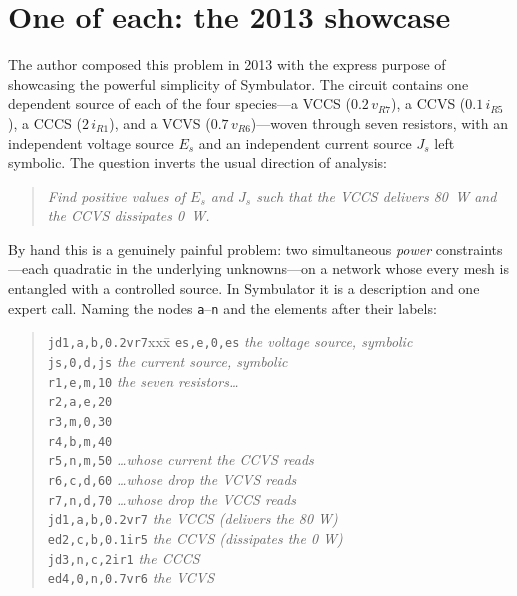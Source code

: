 \documentclass[11pt,oneside]{report}
\newcommand{\code}[1]{\texttt{#1}}
\begin{document}
\section{One of each: the 2013 showcase}
\label{sec:showcase2013}

The author composed this problem in 2013 with the express purpose of
showcasing the powerful simplicity of Symbulator. The circuit
contains one dependent source of each of the four species---a VCCS
($0.2\,v_{R7}$), a CCVS ($0.1\,i_{R5}$), a CCCS ($2\,i_{R1}$), and a
VCVS ($0.7\,v_{R6}$)---woven through seven resistors, with an
independent voltage source $E_s$ and an independent current source
$J_s$ left symbolic. The question inverts the usual direction of
analysis:

\begin{quote}
\emph{Find positive values of $E_s$ and $J_s$ such that the VCCS
delivers 80~W and the CCVS dissipates 0~W.}
\end{quote}

By hand this is a genuinely painful problem: two simultaneous
\emph{power} constraints---each quadratic in the underlying
unknowns---on a network whose every mesh is entangled with a
controlled source. In Symbulator it is a description and one expert
call. Naming the nodes \code{a}--\code{n} and the elements after
their labels:

\begin{quote}
\begin{tabbing}
\code{jd1,a,b,0.2vr7}xxx\=\kill
\code{es,e,0,es}          \> \emph{the voltage source, symbolic} \\
\code{js,0,d,js}          \> \emph{the current source, symbolic} \\
\code{r1,e,m,10}          \> \emph{the seven resistors\ldots} \\
\code{r2,a,e,20} \\
\code{r3,m,0,30} \\
\code{r4,b,m,40} \\
\code{r5,n,m,50}          \> \emph{\ldots whose current the CCVS reads} \\
\code{r6,c,d,60}          \> \emph{\ldots whose drop the VCVS reads} \\
\code{r7,n,d,70}          \> \emph{\ldots whose drop the VCCS reads} \\
\code{jd1,a,b,0.2vr7}     \> \emph{the VCCS (delivers the 80 W)} \\
\code{ed2,c,b,0.1ir5}     \> \emph{the CCVS (dissipates the 0 W)} \\
\code{jd3,n,c,2ir1}       \> \emph{the CCCS} \\
\code{ed4,0,n,0.7vr6}     \> \emph{the VCVS}
\end{tabbing}
\end{quote}
\end{document}
